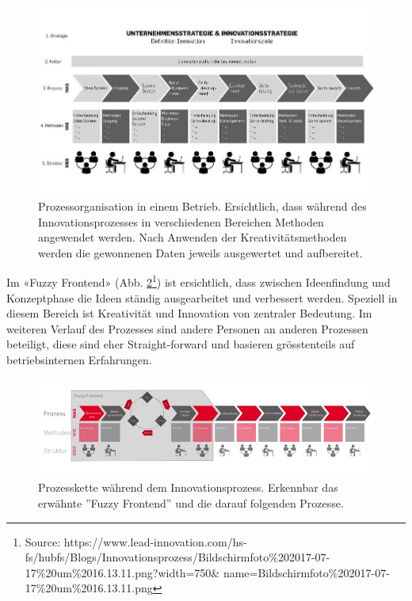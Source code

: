 \begin{figure}[h!]
	\centering
	\includegraphics[width=\textwidth]{graphics/Grafik1}
	\caption{Prozessorganisation in einem Betrieb. Ersichtlich, dass während des Innovationsprozesses in verschiedenen Bereichen Methoden angewendet werden. Nach Anwenden der Kreativitätsmethoden werden die gewonnenen Daten jeweils ausgewertet und aufbereitet.}
	\label{fig:Grafik1}
\end{figure} 

Im «Fuzzy Frontend» (Abb. \ref{fig:Grafik2}\footnote{Source: https://www.lead-innovation.com/hs-fs/hubfs/Blogs/Innovationsprozess/Bildschirmfoto\%202017-07-17\%20um\%2016.13.11.png?width=750\& name=Bildschirmfoto\%202017-07-17\%20um\%2016.13.11.png}) ist ersichtlich, dass zwischen Ideenfindung und Konzeptphase die Ideen ständig ausgearbeitet und verbessert werden. Speziell in diesem Bereich ist Kreativität und Innovation von zentraler Bedeutung. Im weiteren Verlauf des Prozesses sind andere Personen an anderen Prozessen beteiligt, diese sind eher Straight-forward und basieren grösstenteils auf betriebsinternen Erfahrungen.

\begin{figure}[h!]
	\centering
	\includegraphics[width=\textwidth]{graphics/Grafik2}
	\caption{Prozesskette während dem Innovationsprozess. Erkennbar das erwähnte ''Fuzzy Frontend'' und die darauf folgenden Prozesse.}
	\label{fig:Grafik2}
\end{figure} 

